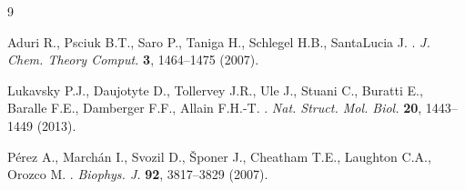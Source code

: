 \documentclass[11pt,a4paper]{article}
\begin{document}
\renewcommand*{\bibfont}{\small}
\begin{thebibliography}{9}

Aduri R., Psciuk B.T., Saro P., Taniga H., Schlegel H.B., SantaLucia J.
.
\newblock \emph{J. Chem. Theory Comput.} \textbf{3}, 1464--1475 (2007).

Lukavsky P.J., Daujotyte D., Tollervey J.R., Ule J., Stuani C., Buratti E.,
Baralle F.E., Damberger F.F., Allain F.H.-T.
.
\newblock \emph{Nat. Struct. Mol. Biol.} \textbf{20}, 1443--1449 (2013).

P\'erez A., March\'an I., Svozil D., \v{S}poner J., Cheatham T.E.,
Laughton C.A., Orozco M.
.
\newblock \emph{Biophys. J.} \textbf{92}, 3817--3829 (2007).

\end{thebibliography}
\end{document}
